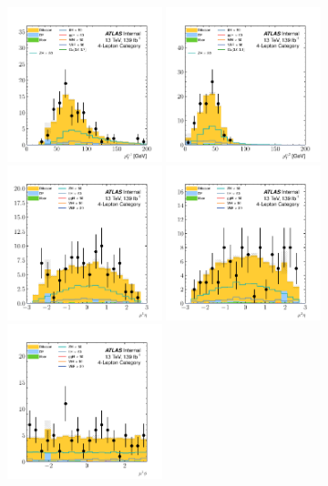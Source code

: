 \clearpage
\begin{figure}[htpb]
  \centering
  \includegraphics[width=0.4\textwidth]{figures/hmm/kinematics/histo-4lep-u1_pt.pdf}
  \includegraphics[width=0.4\textwidth]{figures/hmm/kinematics/histo-4lep-u2_pt.pdf}
  \includegraphics[width=0.4\textwidth]{figures/hmm/kinematics/histo-4lep-u1_eta.pdf}
  \includegraphics[width=0.4\textwidth]{figures/hmm/kinematics/histo-4lep-u2_eta.pdf}
  \includegraphics[width=0.4\textwidth]{figures/hmm/kinematics/histo-4lep-u1_phi.pdf}

\end{figure}
